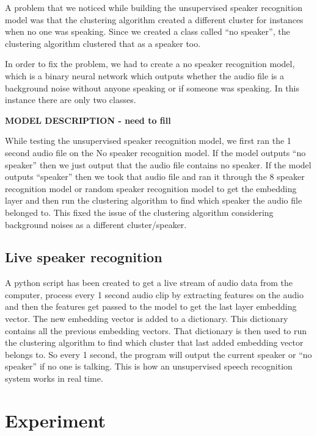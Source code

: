 \documentclass[10pt,twocolumn,letterpaper]{article}
\begin{document}
A problem that we noticed while building the unsupervised speaker recognition model was that the clustering algorithm created a different cluster for instances when no one was speaking. Since we created a class called “no speaker”, the clustering algorithm clustered that as a speaker too.

In order to fix the problem, we had to create a no speaker recognition model, which is a binary neural network which outputs whether the audio file is a background noise without anyone speaking or if someone was speaking. In this instance there are only two classes.

\textbf{MODEL DESCRIPTION - need to fill}


While testing the unsupervised speaker recognition model, we first ran the 1 second audio file on the  No speaker recognition model. If the model outputs “no speaker” then we just output that the audio file contains no speaker. If the model outputs “speaker” then we took that audio file and ran it through the 8 speaker recognition model or random speaker recognition model to get the embedding layer and then run the clustering algorithm to find which speaker the audio file belonged to. This fixed the issue of the clustering algorithm considering background noises as a different cluster/speaker.



\subsection{Live speaker recognition}

A python script has been created to get a live stream of audio data from the computer, process every 1 second audio clip by extracting features on the audio and then the features get passed to the model to get the last layer embedding vector. The new embedding vector is added to a dictionary. This dictionary contains all the previous embedding vectors. That dictionary is then used to run the clustering algorithm to find which cluster that last added embedding vector belongs to.  So every 1 second, the program will output the current speaker or “no speaker” if no one is talking. This is how an unsupervised speech recognition system works in real time.


\section{Experiment}
\end{document}

